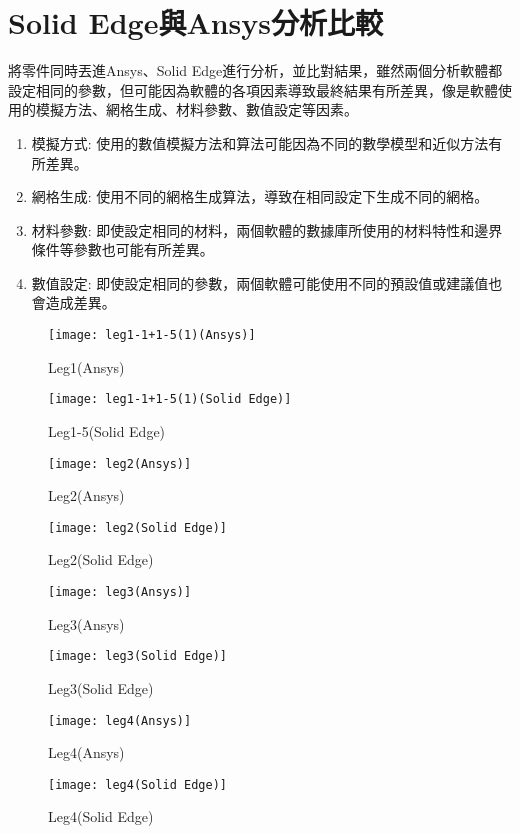 \section{Solid Edge與Ansys分析比較}
將零件同時丟進Ansys、Solid Edge進行分析，並比對結果，雖然兩個分析軟體都設定相同的參數，但可能因為軟體的各項因素導致最終結果有所差異，像是軟體使用的模擬方法、網格生成、材料參數、數值設定等因素。\
\begin{enumerate}
\item 模擬方式: 使用的數值模擬方法和算法可能因為不同的數學模型和近似方法有所差異。
\item 網格生成: 使用不同的網格生成算法，導致在相同設定下生成不同的網格。
\item 材料參數: 即使設定相同的材料，兩個軟體的數據庫所使用的材料特性和邊界條件等參數也可能有所差異。
\item	數值設定: 即使設定相同的參數，兩個軟體可能使用不同的預設值或建議值也會造成差異。
\end{enumerate}
\begin{figure}[hbt!]
\center
\texttt{[image: leg1-1+1-5(1)(Ansys)]}
\caption{\Large Leg1(Ansys)}
\label{leg1-1+1-5(1)(Ansys)}
\end{figure}

\begin{figure}[hbt!]
\center
\texttt{[image: leg1-1+1-5(1)(Solid Edge)]}
\caption{\Large Leg1-5(Solid Edge)}
\label{leg1-1+1-5(1)(Solid Edge)}
\end{figure}

\begin{figure}[hbt!]
\center
\texttt{[image: leg2(Ansys)]}
\caption{\Large Leg2(Ansys)}
\label{leg2(Ansys)}
\end{figure}

\begin{figure}[hbt!]
\center
\texttt{[image: leg2(Solid Edge)]}
\caption{\Large Leg2(Solid Edge)}
\label{leg2(Solid Edge)}
\end{figure}

\begin{figure}[hbt!]
\center
\texttt{[image: leg3(Ansys)]}
\caption{\Large Leg3(Ansys)}
\label{leg3(Ansys)}
\end{figure}

\begin{figure}[hbt!]
\center
\texttt{[image: leg3(Solid Edge)]}
\caption{\Large Leg3(Solid Edge)}
\label{leg3(Solid Edge)}
\end{figure}

\begin{figure}[hbt!]
\center
\texttt{[image: leg4(Ansys)]}
\caption{\Large Leg4(Ansys)}
\label{leg4(Ansys)}
\end{figure}

\begin{figure}[hbt!]
\center
\texttt{[image: leg4(Solid Edge)]}
\caption{\Large Leg4(Solid Edge)}
\label{leg4(Solid Edge)}
\end{figure}
\newpage
